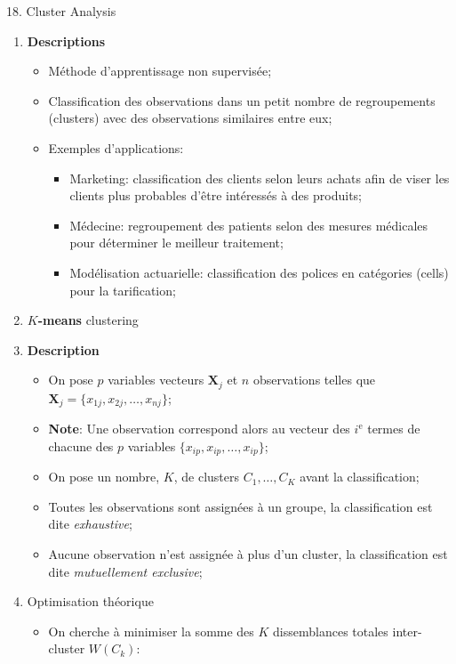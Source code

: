 \documentclass[12pt, titlepage, french]{report}
\begin{document}
\begin{CHPT_SUMM}[label = {CLUSTERS}]{18. Cluster Analysis}
\begin{enumerate}
	\item	\textbf{Descriptions}
		\begin{itemize}
		\item	Méthode d'apprentissage non supervisée;
		\item	Classification des observations dans un petit nombre de regroupements (clusters) avec des observations similaires entre eux;
		\item	Exemples d'applications:		
			\begin{itemize}
			\item	Marketing: classification des clients selon leurs achats afin de viser les clients plus probables d'être intéressés à des produits;
			\item	Médecine: regroupement des patients selon des mesures médicales pour déterminer le meilleur traitement;
			\item	Modélisation actuarielle: classification des polices en catégories (cells) pour la tarification;
			\end{itemize}
		\end{itemize}
	\item	\textbf{$K$-means} clustering
%	
	\item[]	\textbf{Description}
		\begin{itemize}
		\item	On pose $p$ variables vecteurs $\bm{X}_{j}$ et $n$ observations telles que $\bm{X}_{j} = \{x_{1j}, x_{2j}, \dots, x_{nj}\}$;
		\item[]	\textbf{Note}: Une observation correspond alors au vecteur des $i^{\text{e}}$ termes de chacune des $p$ variables $\{x_{ip}, x_{ip}, \dots, x_{ip}\}$;
		\item	On pose un nombre, $K$, de clusters $C_{1}, \dots, C_{K}$ avant la classification;
		\item	Toutes les observations sont assignées à un groupe, la classification est dite \textit{exhaustive};
		\item	Aucune observation n'est assignée à plus d'un cluster, la classification est dite \textit{mutuellement exclusive};
		\end{itemize}
%
	\item[]	Optimisation théorique
		\begin{itemize}
		\item	On cherche à minimiser la somme des $K$ dissemblances totales inter-cluster $W(C_{k})$: 

\end{itemize}
\end{enumerate}
\end{CHPT_SUMM}
\end{document}
